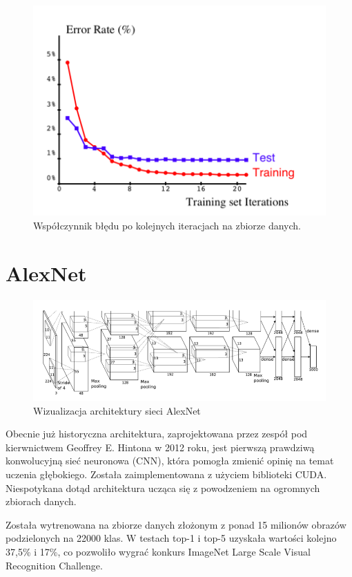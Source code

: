 \documentclass[12pt,a4paper,twoside,titlepage,openright]{book}
\begin{document}
\begin{itemize}
\begin{itemize}
\begin{figure}[ht]
	\centering
			\includegraphics[resolution=100, scale=0.45]{leNetTraining.png}
		\caption{Współczynnik błędu po kolejnych iteracjach na zbiorze danych.}
\end{figure}


\section{AlexNet}
\begin{figure}[ht]
	\centering
			\includegraphics[resolution=100, scale=0.65]{AlexNet.png}
		\caption{Wizualizacja architektury sieci AlexNet}
				\label{fig:alexnet}
\end{figure}

Obecnie już historyczna architektura, zaprojektowana przez zespół pod kierwnictwem Geoffrey E. Hintona w 2012 roku, jest pierwszą prawdziwą konwolucyjną sieć neuronowa (CNN), która pomogła zmienić opinię na temat uczenia głębokiego. Została zaimplementowana z użyciem biblioteki CUDA. Niespotykana dotąd architektura ucząca się z powodzeniem na ogromnych zbiorach danych.
 
 Została wytrenowana na zbiorze danych złożonym z ponad 15 milionów obrazów podzielonych na 22000 klas. 
 W testach top-1 i top-5 uzyskała wartości kolejno 37,5\% i 17\%, co pozwoliło wygrać konkurs ImageNet Large Scale Visual Recognition Challenge. 
 

\end{itemize}
\end{itemize}
\end{document}
